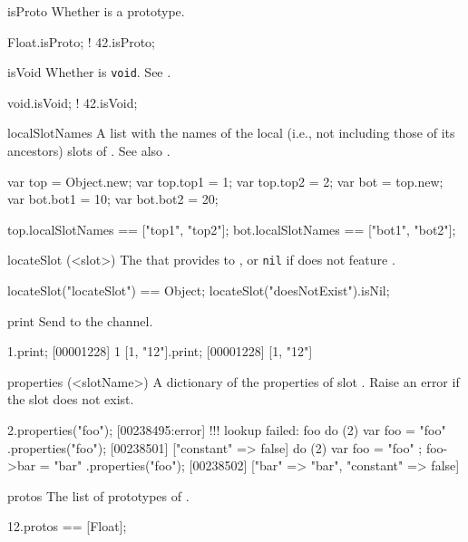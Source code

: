 \begin{urbiscriptapi}
\item[isProto]%
  Whether \this is a prototype.
\begin{urbiassert}
 Float.isProto;
!   42.isProto;
\end{urbiassert}


\item[isVoid]%
  Whether \this is \lstinline|void|.  See .
\begin{urbiassert}
void.isVoid;
! 42.isVoid;
\end{urbiassert}


\item[localSlotNames]%
  A list with the names of the local (i.e., not including those of its
  ancestors) slots of \this.  See also .
\begin{urbiassert}
var top = Object.new;
var top.top1 = 1;
var top.top2 = 2;
var bot = top.new;
var bot.bot1 = 10;
var bot.bot2 = 20;

top.localSlotNames == ["top1", "top2"];
bot.localSlotNames == ["bot1", "bot2"];
\end{urbiassert}


\item[locateSlot](<slot>)%
  The  that provides  to \this, or \lstinline|nil| if
  \this does not feature .
\begin{urbiassert}
locateSlot("locateSlot") == Object;
locateSlot("doesNotExist").isNil;
\end{urbiassert}


\item[print] Send \this to the  channel.
\begin{urbiscript}
1.print;
[00001228] 1
[1, "12"].print;
[00001228] [1, "12"]
\end{urbiscript}


\item[properties](<slotName>)%
  A dictionary of the properties of slot .  Raise an error if
  the slot does not exist.
\begin{urbiscript}
2.properties("foo");
[00238495:error] !!! lookup failed: foo
do (2) { var foo = "foo" }.properties("foo");
[00238501] ["constant" => false]
do (2) { var foo = "foo" ; foo->bar = "bar" }.properties("foo");
[00238502] ["bar" => "bar", "constant" => false]
\end{urbiscript}


\item[protos]
  The list of prototypes of \this.
\begin{urbiassert}
12.protos == [Float];
\end{urbiassert}



\end{urbiscriptapi}
